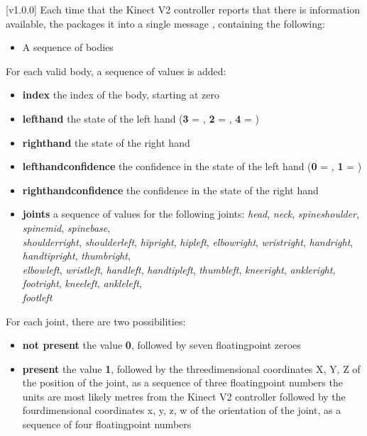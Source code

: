 [v1.0.0]
Each time that the Kinect V2 controller reports that there is information
available, the  packages it into a single message
\openSq{}\closeSq, containing the following:
\begin{itemize}
\item A sequence of bodies
\end{itemize}

For each valid body, a sequence of values is added:
\begin{itemize}
\item\textbf{index} \longDash{} the index of the body, starting at zero
\item\textbf{lefthand} \longDash{} the state of the left hand (\textbf{3} =
, \textbf{2} = , \textbf{4} = )
\item\exSp\textbf{righthand} \longDash{} the state of the right hand
\item\exSp\textbf{lefthandconfidence} \longDash{} the confidence in the state of the left
hand (\textbf{0} = , \textbf{1} = )
\item\exSp\textbf{righthandconfidence} \longDash{} the confidence in the state of the
right hand
\item\exSp\textbf{joints} \longDash{} a sequence of values for the following joints:
\textbraceleft{} \emph{head}, \emph{neck}, \emph{spineshoulder}, \emph{spinemid},
\emph{spinebase},\\
\emph{shoulderright}, \emph{shoulderleft}, \emph{hipright}, \emph{hipleft},
\emph{elbowright}, \emph{wristright}, \emph{handright}, \emph{handtipright},
\emph{thumbright},\\
\emph{elbowleft}, \emph{wristleft}, \emph{handleft}, \emph{handtipleft}, \emph{thumbleft},
\emph{kneeright}, \emph{ankleright}, \emph{footright}, \emph{kneeleft},
\emph{ankleleft},\\
\emph{footleft} \textbraceright
\end{itemize}

For each joint, there are two possibilities:
\begin{itemize}
\item\textbf{not present} \longDash{} the value \textbf{0}, followed by seven
floating\longDash{}point zeroes
\item\exSp\textbf{present} \longDash{} the value \textbf{1}, followed by the
three\longDash{}dimensional coordinates \openSq{}X, Y, Z\closeSq{} of the position of the
joint, as a sequence of three floating\longDash{}point numbers \longDash{} the units are
most likely metres from the Kinect V2 controller \longDash{} followed by the
four\longDash{}dimensional coordinates \openSq{}x, y, z, w\closeSq{} of the orientation of
the joint, as a sequence of four floating\longDash{}point numbers
\end{itemize}
\appendixEnd{}
